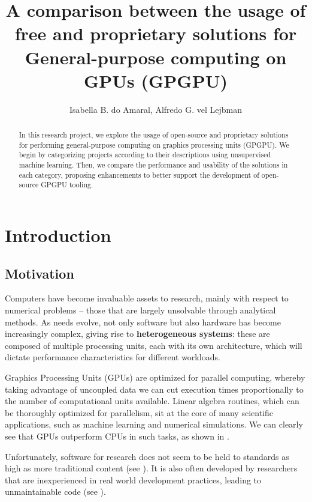 \documentclass[12pt]{article}
\title{A comparison between the usage of free and proprietary solutions for General-purpose computing on GPUs (GPGPU)}
\author{Isabella B. do Amaral\inst{1}, Alfredo G. vel Lejbman\inst{2}}
\begin{document}
\maketitle

\begin{abstract}
    In this research project, we explore the usage of open-source and proprietary solutions for
    performing general-purpose computing on graphics processing units (GPGPU).
    We begin by categorizing projects according to their descriptions using unsupervised machine
    learning.
    Then, we compare the performance and usability of the solutions in each category, proposing
    enhancements to better support the development of open-source GPGPU tooling.
\end{abstract}

\section{Introduction} \label{sec:intro}

\subsection{Motivation} \label{sec:intro:motivation}

Computers have become invaluable assets to research, mainly with respect to
numerical problems -- those that are largely unsolvable through analytical
methods.
As needs evolve, not only software but also hardware has become increasingly
complex, giving rise to \textbf{heterogeneous systems}:
these are composed of multiple processing units, each with its own
architecture, which will dictate performance characteristics for different
workloads.

Graphics Processing Units (GPUs) are optimized for parallel computing, whereby
taking advantage of uncoupled data we can cut execution times proportionally to
the number of computational units available.
Linear algebra routines, which can be thoroughly optimized for parallelism, sit
at the core of many scientific applications, such as machine learning and
numerical simulations.
We can clearly see that GPUs outperform CPUs in such tasks, as shown in
\cite{buber2018performance}.

Unfortunately, software for research does not seem to be held to standards as
high as more traditional content (see \cite{sufi2014software}).
It is also often developed by researchers that are inexperienced in real
world development practices, leading to unmaintainable code (see
\cite{carver2022survey}).
\end{document}
